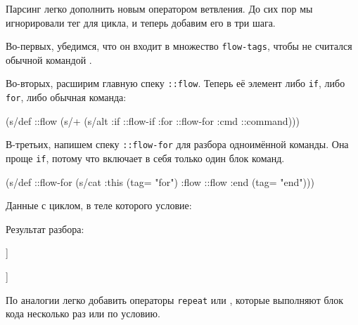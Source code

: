 Парсинг легко дополнить новым оператором ветвления. До сих пор мы игнорировали
тег  для цикла, и теперь добавим его в три шага.

Во-первых, убедимся, что он входит в множество \texttt{flow-tags}, чтобы
 не считался обычной командой .

Во-вторых, расширим главную спеку \texttt{::flow}. Теперь её элемент либо
\texttt{if}, либо \texttt{for}, либо обычная команда:


\begin{clojure}
(s/def ::flow
  (s/+
   (s/alt :if ::flow-if
          :for ::flow-for
          :cmd ::command)))
\end{clojure}


В-третьих, напишем спеку \texttt{::flow-for} для разбора одноимённой
команды. Она проще \texttt{if}, потому что включает в себя только один блок
команд.


\begin{clojure}
(s/def ::flow-for
  (s/cat :this (tag= "for")
         :flow ::flow
         :end (tag= "end")))
\end{clojure}


Данные с циклом, в теле которого условие:


\begin{clojure}
\end{clojure}


Результат разбора:

\pagebreakafive

\ifnarrow


\begin{clojure}
[[:for
  {:this {:command "for"}
   :flow
   [[:if
     {:this {:command "if" ...}
      :flow [[:cmd {:command "print" ...}]]
      :end {:command "end"}}]]
   :end {:command "end"}}]]
\end{clojure}


\else


\begin{clojure}
[[:for
  {:this {:command "for"}
   :flow
   [[:if
     {:this {:command "if" :condition "..."}
      :flow [[:cmd {:command "print" :text "hello"}]]
      :end {:command "end"}}]]
   :end {:command "end"}}]]
\end{clojure}


\fi

По аналогии легко добавить операторы \texttt{repeat} или , которые
выполняют блок кода несколько раз или по условию.

